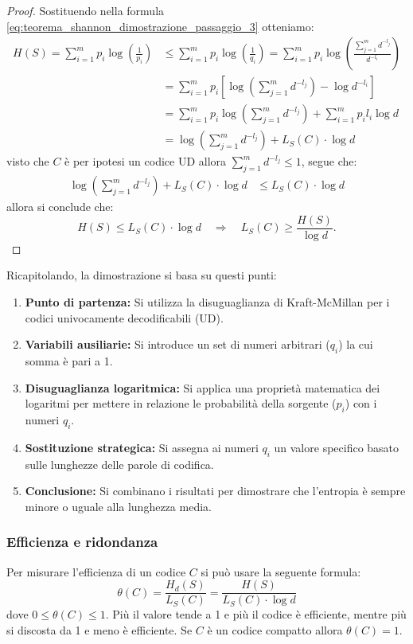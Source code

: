 \documentclass{article}
\theoremstyle{definition}
\numberwithin{equation}{section}
\begin{document}
\begin{proof}
    Sostituendo nella formula \eqref{eq:teorema_shannon_dimostrazione_passaggio_3} otteniamo:
    \begin{align*}
        H(S)  = \sum_{i=1}^m p_i \log\!\left(\frac{1}{p_i}\right)
         & \leq \sum_{i=1}^m p_i \log\!\left(\frac{1}{q_i}\right)
        = \sum_{i=1}^m p_i \log\!\left(\frac{\sum_{j=1}^m d^{-l_j}}{d^{-l_i}}\right)                 \\
         & = \sum_{i=1}^m p_i \left[\log\!\left(\sum_{j=1}^m d^{-l_j}\right) - \log d^{-l_i}\right]  \\
         & = \sum_{i=1}^m p_i \log\!\left(\sum_{j=1}^m d^{-l_j}\right) + \sum_{i=1}^m p_i l_i \log d \\
         & = \log\!\left(\sum_{j=1}^m d^{-l_j}\right) + L_S(C)\cdot \log d
    \end{align*}
    visto che $C$ è per ipotesi un codice UD allora $\sum_{j=1}^m d^{-l_j} \leq 1$, segue che:
    \begin{align*}
        \log\!\left(\sum_{j=1}^m d^{-l_j}\right) + L_S(C)\cdot \log d
         & \leq L_S(C)\cdot \log d
    \end{align*}
    allora si conclude che:
    \[
        H(S) \leq L_S(C)\cdot \log d
        \quad\Rightarrow\quad
        L_S(C) \geq \frac{H(S)}{\log d}.
    \]
\end{proof}
Ricapitolando, la dimostrazione si basa su questi punti:
\begin{enumerate}
    \item \textbf{Punto di partenza:} Si utilizza la disuguaglianza di Kraft-McMillan per i codici univocamente decodificabili (UD).
    \item \textbf{Variabili ausiliarie:} Si introduce un set di numeri arbitrari ($q_i$) la cui somma è pari a 1.
    \item \textbf{Disuguaglianza logaritmica:} Si applica una proprietà matematica dei logaritmi per mettere in relazione le probabilità della sorgente ($p_i$) con i numeri $q_i$.
    \item \textbf{Sostituzione strategica:} Si assegna ai numeri $q_i$ un valore specifico basato sulle lunghezze delle parole di codifica.
    \item \textbf{Conclusione:} Si combinano i risultati per dimostrare che l'entropia è sempre minore o uguale alla lunghezza media.
\end{enumerate}

\subsubsection{Efficienza e ridondanza}
Per misurare l'efficienza di un codice $C$ si può usare la seguente formula:
\[
    \theta(C) = \frac{H_d(S)}{L_S(C)} = \frac{H(S)}{L_S(C)\cdot \log d}
\]
dove $0 \leq \theta(C) \leq 1$. Più il valore tende a 1 e più il codice è efficiente, mentre più si discosta da 1 e meno è efficiente. Se $C$ è un codice compatto allora $\theta(C)=1$.
\end{document}
